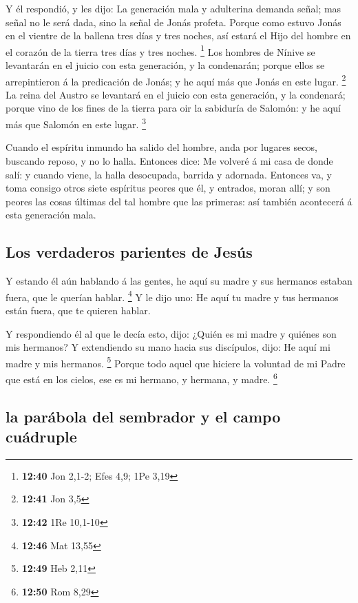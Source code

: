  Y él respondió, y les dijo: La generación mala y
adulterina demanda señal; mas señal no le será dada, sino la señal de
Jonás profeta.  Porque como estuvo Jonás en el vientre de
la ballena tres días y tres noches, así estará el Hijo del hombre en el
corazón de la tierra tres días y tres noches. \footnote{\textbf{12:40}
  Jon 2,1-2; Efes 4,9; 1Pe 3,19}  Los hombres de Nínive se
levantarán en el juicio con esta generación, y la condenarán; porque
ellos se arrepintieron á la predicación de Jonás; y he aquí más que
Jonás en este lugar. \footnote{\textbf{12:41} Jon 3,5}  La
reina del Austro se levantará en el juicio con esta generación, y la
condenará; porque vino de los fines de la tierra para oir la sabiduría
de Salomón: y he aquí más que Salomón en este lugar. \footnote{\textbf{12:42}
  1Re 10,1-10}

 Cuando el espíritu inmundo ha salido del hombre, anda por
lugares secos, buscando reposo, y no lo halla.  Entonces
dice: Me volveré á mi casa de donde salí: y cuando viene, la halla
desocupada, barrida y adornada.  Entonces va, y toma
consigo otros siete espíritus peores que él, y entrados, moran allí; y
son peores las cosas últimas del tal hombre que las primeras: así
también acontecerá á esta generación mala.

\hypertarget{los-verdaderos-parientes-de-jesuxfas}{%
\subsection{Los verdaderos parientes de
Jesús}\label{los-verdaderos-parientes-de-jesuxfas}}

 Y estando él aún hablando á las gentes, he aquí su madre y
sus hermanos estaban fuera, que le querían hablar. \footnote{\textbf{12:46}
  Mat 13,55}  Y le dijo uno: He aquí tu madre y tus
hermanos están fuera, que te quieren hablar.

 Y respondiendo él al que le decía esto, dijo: ¿Quién es mi
madre y quiénes son mis hermanos?  Y extendiendo su mano
hacia sus discípulos, dijo: He aquí mi madre y mis hermanos. \footnote{\textbf{12:49}
  Heb 2,11}  Porque todo aquel que hiciere la voluntad de
mi Padre que está en los cielos, ese es mi hermano, y hermana, y madre.
\footnote{\textbf{12:50} Rom 8,29}

\hypertarget{la-paruxe1bola-del-sembrador-y-el-campo-cuuxe1druple}{%
\subsection{la parábola del sembrador y el campo
cuádruple}\label{la-paruxe1bola-del-sembrador-y-el-campo-cuuxe1druple}}

